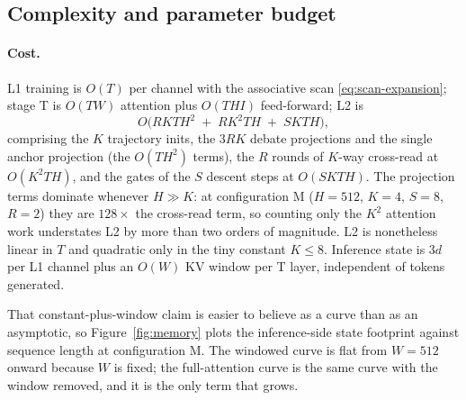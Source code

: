 \documentclass[11pt,a4paper]{article}
\theoremstyle{plain}
\theoremstyle{definition}
\theoremstyle{remark}
\begin{document}
\subsection{Complexity and parameter budget}

\paragraph{Cost.}
L1 training is $O(T)$ per channel with the associative scan
\eqref{eq:scan-expansion}; stage T is $O(TW)$ attention plus $O(T H I)$
feed-forward; L2 is
\begin{equation}
  O\bigl(R K T H^2 \;+\; R K^2 T H \;+\; S K T H\bigr),
  \label{eq:l2-cost}
\end{equation}
comprising the $K$ trajectory inits, the $3RK$ debate projections and the
single anchor projection (the $O(TH^2)$ terms), the $R$ rounds of $K$-way
cross-read at $O(K^2TH)$, and the gates of the $S$ descent steps at $O(SKTH)$.
The projection terms dominate whenever $H \gg K$: at configuration M
($H{=}512$, $K{=}4$, $S{=}8$, $R{=}2$) they are $128\times$ the cross-read
term, so counting only the $K^2$ attention work understates L2 by more than two
orders of magnitude. L2 is nonetheless linear in $T$ and quadratic only in the
tiny constant $K \le 8$.
Inference state is $3d$ per L1 channel plus an $O(W)$ KV window per T layer,
independent of tokens generated.

That constant-plus-window claim is easier to believe as a curve than as an
asymptotic, so Figure~\ref{fig:memory} plots the inference-side
state footprint against sequence length at configuration M. The windowed curve
is flat from $W = 512$ onward because $W$ is fixed; the full-attention curve is
the same curve with the window removed, and it is the only term that grows.
\end{document}
